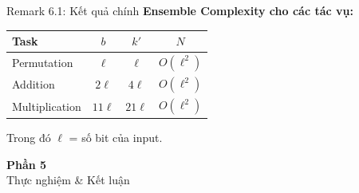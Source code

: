\begin{frame}{Remark 6.1: Kết quả chính}
  \textbf{Ensemble Complexity cho các tác vụ:}
  
  \vspace{0.3cm}
  \begin{center}
  \begin{tabular}{|l|c|c|c|}
    \hline
    \textbf{Task} & $b$ & $k'$ & $N$ \\
    \hline
    Permutation & $\ell$ & $\ell$ & $O(\ell^2)$ \\
    Addition & $2\ell$ & $4\ell$ & $O(\ell^2)$ \\
    Multiplication & $11\ell$ & $21\ell$ & $O(\ell^2)$ \\
    \hline
  \end{tabular}
  \end{center}
  
  \vspace{0.3cm}
  Trong đó $\ell$ = số bit của input.
\end{frame}

\begin{frame}{}
  \centering
  \vfill
  {\Huge \textbf{Phần 5}}\\[0.5cm]
  {\Large Thực nghiệm \& Kết luận}
  \vfill
\end{frame}
